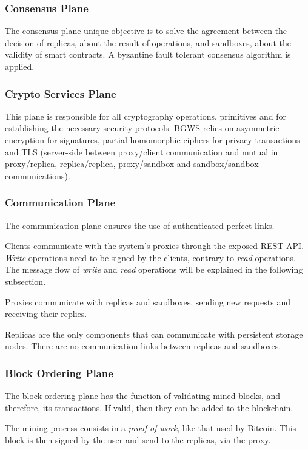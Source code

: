 \documentclass[10pt,journal,compsoc]{IEEEtran}
\begin{document}
	\subsubsection{Consensus Plane}
	The consensus plane unique objective is to solve the agreement between the decision of replicas, about the result of operations, and sandboxes, about the validity of smart contracts. A byzantine fault tolerant consensus algorithm is applied.
	
	\subsubsection{Crypto Services Plane}
	This plane is responsible for all cryptography operations, primitives and for establishing the necessary security protocols. BGWS relies on asymmetric encryption for signatures, partial homomorphic ciphers for privacy transactions and TLS (server-side between proxy/client communication and mutual in proxy/replica, replica/replica, proxy/sandbox and sandbox/sandbox communications).
	
	\subsubsection{Communication Plane}
	The communication plane ensures the use of authenticated perfect links. 
	
	Clients communicate with the system's proxies through the exposed REST API. \textit{Write} operations need to be signed by the clients, contrary to \textit{read} operations. The message flow of \textit{write} and \textit{read} operations will be explained in the following subsection.
	
	Proxies communicate with replicas and sandboxes, sending new requests and receiving their replies.
	
	Replicas are the only components that can communicate with persistent storage nodes. There are no communication links between replicas and sandboxes.
	
	\subsubsection{Block Ordering Plane}
	
	The block ordering plane has the function of validating mined blocks, and therefore, its transactions. If valid, then they can be added to the blockchain.
	
    The mining process consists in a \textit{proof of work}, like that used by Bitcoin. This block is then signed by the user and send to the replicas, via the proxy.
    
\end{document}
